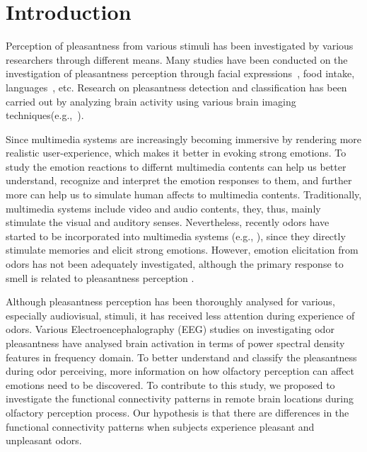 \section{Introduction}


Perception of pleasantness from various stimuli has been investigated by various researchers through different means. Many studies have been conducted on the investigation of pleasantness perception through facial expressions~\cite{lyons1998coding}, food intake\cite{de2003taste}, languages~\cite{bellezza1986words}, etc. Research on pleasantness detection and classification has been carried out by analyzing brain activity using various brain imaging techniques(e.g.,~\cite{zatorre2000neural,kringelbach2003activation,kroupi2014eeg}).


Since multimedia systems are increasingly becoming immersive by rendering more realistic user-experience, which makes it better in evoking strong emotions. To study the emotion reactions to differnt multimedia contents can help us better understand, recognize and interpret the emotion responses to them, and further more can help us to simulate human affects to multimedia contents. Traditionally, multimedia systems include video and audio contents, they, thus, mainly stimulate the visual and auditory senses. Nevertheless, recently odors have started to be incorporated into multimedia systems (e.g., \cite{nakamoto2011olfactory,nakamoto2008cooking,richard2006multi}), since they directly stimulate memories and elicit strong emotions. However, emotion elicitation from odors has not been adequately investigated, although the primary response to smell is related to pleasantness perception \cite{gulas1995right}. 


Although pleasantness perception has been thoroughly analysed for various, especially audiovisual, stimuli, it has received less attention during experience of odors. Various Electroencephalography (EEG) studies on investigating odor pleasantness have analysed brain activation in terms of power spectral density features in frequency domain. To better understand and classify the pleasantness during odor perceiving, more information on how olfactory perception can affect emotions need to be discovered. To contribute to this study, we proposed to investigate the functional connectivity patterns in remote brain locations during olfactory perception process. Our hypothesis is that there are differences in the functional connectivity patterns when subjects experience pleasant and unpleasant odors. 

